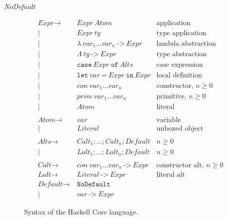\textit{NoDefault}\begin{figure}[h]
\begin{align*}
\textit{Expr} \to~& \textit{Expr}~\textit{Atom} & \text{application}\\
|~& \textit{Expr}~\textit{ty} & \text{type application}\\
|~& \lambda~\textit{var}_1 ... \textit{var}_n~\texttt{{-}{>}}~\textit{Expr} & \text{lambda abstraction}\\
|~& \Lambda~\textit{ty}~\texttt{{-}{>}}~\textit{Expr} & \text{type abstraction}\\
|~& \texttt{case}~\textit{Expr}~\texttt{of}~\textit{Alts} & \text{case expression}\\
|~& \texttt{let}~\textit{var}~\texttt{=}~\textit{Expr}~\texttt{in}~\textit{Expr} & \text{local definition}\\
|~& \textit{con}~\textit{var}_1 ... \textit{var}_n & \text{constructor, $n \geq 0$}\\
|~& \textit{prim}~\textit{var}_1 ... \textit{var}_n & \text{primitive, $n \geq 0$}\\
|~& \textit{Atom} & \text{literal}\\
\\
\textit{Atom} \to~& \textit{var} & \text{variable}\\
|~& \textit{Literal} & \text{unboxed object}\\
\\
\textit{Alts} \to~& \textit{Calt}_1; ...; \textit{Calt}_n; \textit{Default} & \text{$n \geq 0$}\\
|~& \textit{Lalt}_1; ...; \textit{Lalt}_n; \textit{Default} & \text{$n \geq 0$}\\
\\
\textit{Calt} \to~& \textit{con}~\textit{var}_1 ... \textit{var}_n~\texttt{{-}{>}}~\textit{Expr} & \text{constructor alt, $n \geq 0$}\\
\textit{Lalt} \to~& \textit{Literal}~\texttt{{-}{>}}~\textit{Expr} & \text{literal alt}\\
\textit{Default} \to~& \texttt{NoDefault} & \text{}\\
|~& \textit{var}~\texttt{{-}{>}}~\textit{Expr} & \text{}
\end{align*}
\caption{Syntax of the Haskell Core language.}
\label{fig:haskell_core}
\end{figure}
